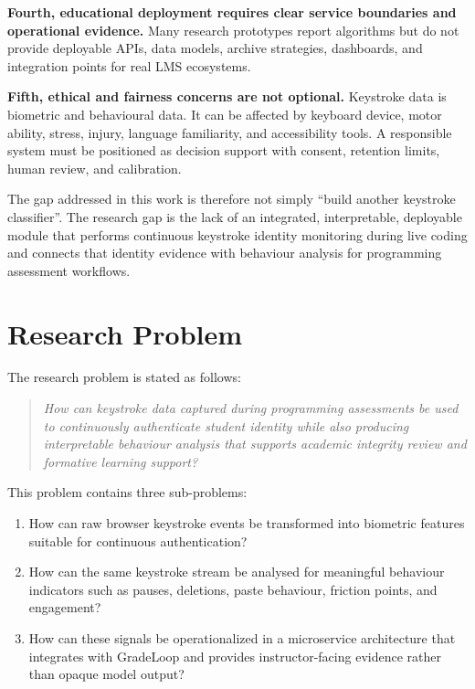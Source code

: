 \textbf{Fourth, educational deployment requires clear service boundaries and operational evidence.} Many research prototypes report algorithms but do not provide deployable APIs, data models, archive strategies, dashboards, and integration points for real LMS ecosystems.

\textbf{Fifth, ethical and fairness concerns are not optional.} Keystroke data is biometric and behavioural data. It can be affected by keyboard device, motor ability, stress, injury, language familiarity, and accessibility tools. A responsible system must be positioned as decision support with consent, retention limits, human review, and calibration.

The gap addressed in this work is therefore not simply ``build another keystroke classifier''. The research gap is the lack of an integrated, interpretable, deployable module that performs continuous keystroke identity monitoring during live coding and connects that identity evidence with behaviour analysis for programming assessment workflows.

\section{Research Problem}
\label{sec:research-problem}

The research problem is stated as follows:

\begin{quote}
\textit{How can keystroke data captured during programming assessments be used to continuously authenticate student identity while also producing interpretable behaviour analysis that supports academic integrity review and formative learning support?}
\end{quote}

This problem contains three sub-problems:

\begin{enumerate}
  \item How can raw browser keystroke events be transformed into biometric features suitable for continuous authentication?
  \item How can the same keystroke stream be analysed for meaningful behaviour indicators such as pauses, deletions, paste behaviour, friction points, and engagement?
  \item How can these signals be operationalized in a microservice architecture that integrates with GradeLoop and provides instructor-facing evidence rather than opaque model output?
\end{enumerate}

